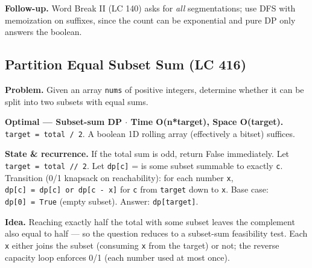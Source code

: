 \documentclass[11pt]{article}
\begin{document}
\textbf{Follow-up.} Word Break II (LC 140) asks for \emph{all} segmentations; use DFS with memoization on suffixes, since the count can be exponential and pure DP only answers the boolean.

\subsection{Partition Equal Subset Sum (LC 416)}\label{partition-equal-subset-sum-lc-416}

\textbf{Problem.} Given an array \texttt{nums} of positive integers, determine whether it can be split into two subsets with equal sums.

\textbf{Optimal --- Subset-sum DP \(\cdot\) Time O(n*target), Space O(target).} \texttt{target\ =\ total\ /\ 2}. A boolean 1D rolling array (effectively a bitset) suffices.

\textbf{State \& recurrence.} If the total sum is odd, return False immediately. Let \texttt{target\ =\ total\ //\ 2}. Let \texttt{dp{[}c{]}} = is some subset summable to exactly \texttt{c}. Transition (0/1 knapsack on reachability): for each number \texttt{x}, \texttt{dp{[}c{]}\ =\ dp{[}c{]}\ or\ dp{[}c\ -\ x{]}} for \texttt{c} from \texttt{target} down to \texttt{x}. Base case: \texttt{dp{[}0{]}\ =\ True} (empty subset). Answer: \texttt{dp{[}target{]}}.

\textbf{Idea.} Reaching exactly half the total with some subset leaves the complement also equal to half --- so the question reduces to a subset-sum feasibility test. Each \texttt{x} either joins the subset (consuming \texttt{x} from the target) or not; the reverse capacity loop enforces 0/1 (each number used at most once).

\end{document}
